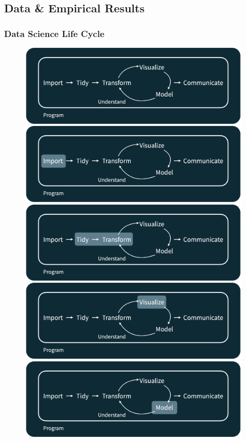\documentclass[11pt]{beamer}
\begin{document}
	\begin{frame}
		\section{Data \& Empirical Results}
		\frametitle{Data Science Life Cycle}


\begin{figure}
	
	\begin{overprint}
		\centering\includegraphics[width=0.8\linewidth]{Images/S1/data-science-cycle/c1}
		\onslide<2>\centering\includegraphics[width=0.8\linewidth]{Images/S1/data-science-cycle/c2}
		\onslide<3>\centering\includegraphics[width=0.8\linewidth]{Images/S1/data-science-cycle/c3}
		\onslide<4>\centering\includegraphics[width=0.8\linewidth]{Images/S1/data-science-cycle/c4}
		\onslide<5>\centering\includegraphics[width=0.8\linewidth]{Images/S1/data-science-cycle/c5}

\end{overprint}
\end{figure}
\end{frame}
\end{document}
